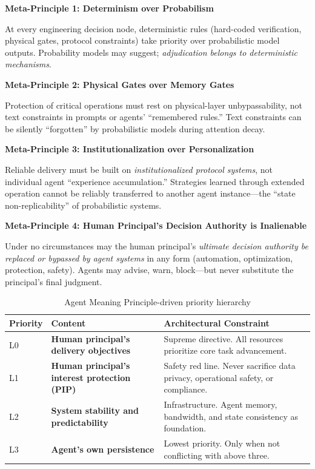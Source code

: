\documentclass[11pt,a4paper]{article}
\begin{document}
\medskip
\noindent\textbf{Meta-Principle 1: Determinism over Probabilism}

At every engineering decision node, deterministic rules (hard-coded verification, physical gates, protocol constraints) take priority over probabilistic model outputs. Probability models may suggest; \emph{adjudication belongs to deterministic mechanisms}.

\medskip
\noindent\textbf{Meta-Principle 2: Physical Gates over Memory Gates}

Protection of critical operations must rest on physical-layer unbypassability, not text constraints in prompts or agents' ``remembered rules.'' Text constraints can be silently ``forgotten'' by probabilistic models during attention decay.

\medskip
\noindent\textbf{Meta-Principle 3: Institutionalization over Personalization}

Reliable delivery must be built on \emph{institutionalized protocol systems}, not individual agent ``experience accumulation.'' Strategies learned through extended operation cannot be reliably transferred to another agent instance---the ``state non-replicability'' of probabilistic systems.

\medskip
\noindent\textbf{Meta-Principle 4: Human Principal's Decision Authority is Inalienable}

Under no circumstances may the human principal's \emph{ultimate decision authority be replaced or bypassed by agent systems} in any form (automation, optimization, protection, safety). Agents may advise, warn, block---but never substitute the principal's final judgment.

\begin{table}[H]
\centering
\small
\begin{tabular}{p{}p{}p{}}
\toprule
\textbf{Priority} & \textbf{Content} & \textbf{Architectural Constraint} \\
\midrule
L0 & \textbf{Human principal's delivery objectives} & Supreme directive. All resources prioritize core task advancement. \\
L1 & \textbf{Human principal's interest protection (PIP)} & Safety red line. Never sacrifice data privacy, operational safety, or compliance. \\
L2 & \textbf{System stability and predictability} & Infrastructure. Agent memory, bandwidth, and state consistency as foundation. \\
L3 & \textbf{Agent's own persistence} & Lowest priority. Only when not conflicting with above three. \\
\bottomrule
\end{tabular}
\caption{Agent Meaning Principle-driven priority hierarchy}
\label{tab:priority}
\end{table}
\end{document}
